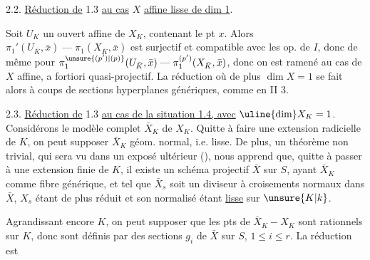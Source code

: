 2.2. \uline{Réduction de} 1.3 \uline{au cas} $X$  \uline{affine lisse de dim 1}.

Soit $U_K$ un ouvert affine  de $X_K$,  contenant le pt  $x$. Alors $\pi_1'(U_{\bar K},\bar x)\mathrel{\text{---}}\pi_1(X_{\bar K},\bar x)$ est surjectif et compatible avec les op. de $I$, donc de même pour $\pi_1^{\unsure{(p')|(p)}}(U_{\bar K},\bar x)\mathrel{\text{---}}\pi_1^{(p')}(X_{\bar K},\bar x)$, donc on est ramené au cas de $X$ affine, a fortiori quasi-projectif. La réduction  où de plus $\dim X=1$ se fait alors à coups de sections hyperplanes génériques, comme en II 3. 

2.3. \uline{Réduction de} 1.3 \uline{au cas de la situation 1.4, avec}  $\uline{\dim} X_K=1$.
Considérons le modèle complet $\bar X_K$ de $X_K$. Quitte à faire une extension radicielle de $K$, on peut supposer $\bar X_K$ géom. normal, i.e. lisse.
De plus, un théorème non trivial, qui sera vu dans un exposé ultérieur (\quad), nous apprend que, quitte à  passer à une extension finie de $K$, il existe un  schéma projectif $\bar X$ sur $S$, ayant $\bar X_K$ comme fibre générique, et tel que $\bar X_s$ soit  un diviseur à croisements normaux dans $\bar X$, $X_s$ étant de plus réduit et son normalisé étant  \uline{lisse} sur $\unsure{K|k}$.


Agrandissant encore $K$, on peut supposer que les pts de $\bar X_K-X_K$ sont rationnels sur $K$, donc  sont définis par des sections $g_i$ de $\bar X$ sur $S$, $1\leq i\leq r$. La réduction est
